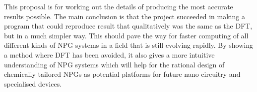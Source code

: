 This proposal is for working out the details of producing the most accurate results possible.\newline
The main conclusion is that the project succeeded in making a program that could reproduce result that qualitatively was the same as the DFT, but in a much simpler way. This should pave the way for faster computing of all different kinds of NPG systems in a field that is still evolving rapidly. By showing a method where DFT has been avoided, it also gives a more intuitive understanding of NPG systems which will help for the rational design of chemically tailored NPGs as potential platforms for future nano circuitry and specialised devices.
